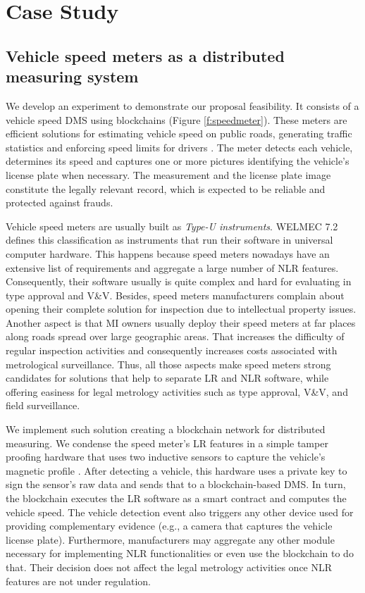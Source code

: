 \documentclass[journal]{IEEEtran}
\begin{document}
\section{Case Study}

\subsection{Vehicle speed meters as a distributed measuring system}

We develop an experiment to demonstrate our proposal feasibility.
It consists of a vehicle speed DMS using blockchains (Figure \ref{f:speedmeter}).
These meters are efficient solutions for estimating vehicle speed on public roads, generating traffic statistics and enforcing speed limits for drivers \cite{Ki2006,S2011}.
The meter detects each vehicle, determines its speed and captures one or more pictures identifying the vehicle's license plate when necessary.
The measurement and the license plate image constitute the legally relevant record, which is expected to be reliable and protected against frauds.

Vehicle speed meters are usually built as \emph{Type-U instruments}. 
WELMEC 7.2 \cite{EuropeanCooperationinLegalMetrologyWELMEC2015} defines this classification as instruments that run their software in universal computer hardware.
This happens because speed meters nowadays have an extensive list of requirements and aggregate a large number of NLR features.
Consequently, their software usually is quite complex and hard for evaluating in type approval and V\&V.
Besides, speed meters manufacturers complain about opening their complete solution for inspection due to intellectual property issues.
Another aspect is that MI owners usually deploy their speed meters at far places along roads spread over large geographic areas.
That increases the difficulty of regular inspection activities and consequently increases costs associated with metrological surveillance.
Thus, all those aspects make speed meters strong candidates for solutions that help to separate LR and NLR software, while offering easiness for legal metrology activities such as type approval, V\&V, and field surveillance.

We implement such solution creating a blockchain network for distributed measuring.
We condense the speed meter's LR features in a simple tamper proofing hardware that uses two inductive sensors to capture the vehicle's magnetic profile \cite{S2011}.
After detecting a vehicle, this hardware uses a private key to sign the sensor's raw data and sends that to a blockchain-based DMS.
In turn, the blockchain executes the LR software as a smart contract and computes the vehicle speed.
The vehicle detection event also triggers any other device used for providing complementary evidence (e.g., a camera that captures the vehicle license plate).
Furthermore, manufacturers may aggregate any other module necessary for implementing NLR functionalities or even use the blockchain to do that.
Their decision does not affect the legal metrology activities once NLR features are not under regulation.
\end{document}
